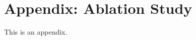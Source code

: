 \documentclass[11pt]{article}
\begin{document}


%



\clearpage
\appendix

\section{Appendix: Ablation Study}
\label{sec:appendixA}
This is an appendix.
\end{document}
